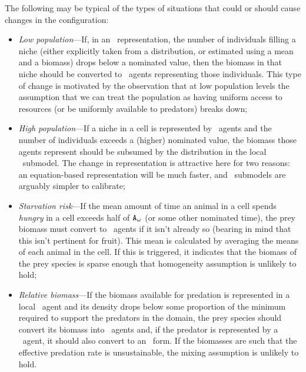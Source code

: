 The following may be typical of the types of situations that could or
should cause changes in the con\-fig\-ur\-a\-tion:
\begin{itemize}
  \item \emph{Low population}---If, in an \SD\ representa\-tion,
    the number of in\-di\-vidu\-als filling a niche (either explicitly taken
    from a distribution, or estimated using a mean and a biomass)
    drops below a nominated value, then the biomass in that niche
    should be converted to \IB\ agents representing those
    in\-di\-vidu\-als. This type of change is motivated by the observation
    that at low population levels the assumption that we can treat the
    population as having uniform access to resources (or be uniformly
    available to predators) breaks down;

  \item \emph{High population}---If a niche in a cell is
    represented by \IB\ agents and the number of in\-di\-vidu\-als exceeds a
    (higher) nominated value, the biomass those agents represent
    should be subsumed by the distribution in the local
    \SD\ submodel. The change in rep\-re\-sen\-ta\-tion is attractive here for
    two reasons: an equation-based rep\-re\-sen\-ta\-tion will be much faster,
    and \SD\ submodels are arguably simpler to calibrate;

  \item \emph{Starvation risk}---If the mean amount of time an
    animal in a cell spends \emph{hungry} in a cell exceeds half of
    $\texttt{A}_\omega$ (or some other nominated time), the prey biomass
    must convert to \IB\ agents if it isn't already so (bearing in
    mind that this isn't pertinent for fruit). This mean is calculated
    by averaging the means of each animal in the cell. If this is
    triggered, it indicates that the biomass of the prey species is
    sparse enough that homogeneity assumption is unlikely to hold;

  \item \emph{Relative biomass}---If the biomass available for
    predation is represented in a local \SD\ agent and its density
    drops below some proportion of the minimum required to support the
    predators in the domain, the prey species should convert its
    biomass into \IB\ agents and, if the predator is represented by a
    \SD\ agent, it should also convert to an \IB\ form. If the
    biomasses are such that the effective predation rate is
    unsustainable, the mixing assumption is unlikely to hold.
\end{itemize}


